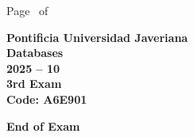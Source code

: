 \documentclass[11pt, addpoints]{exam}\usepackage[utf8]{inputenc}
\begin{document}
\begin{coverpages}
\begin{center}
			\vspace{3mm}
			\leavevmode \hspace{5mm} 
		\end{center}
	\end{coverpages}

	\footer{} {Page \thepage\ of \numpages} {}

	\centering
	\textbf{\Large Pontificia Universidad Javeriana}\\
	\textbf{\Large Databases} \\
	\textbf{\large 2025 -- 10} \\
	\textbf{\large 3rd Exam} \\
	\textbf{Code: A6E901}


	\begin{questions}
		
		
		
		
		
		
		
		
		
		
		
		
		
		
		
		
		
		
		
		
	\end{questions}

	\vspace{5mm}
	\noindent \textbf{End of Exam}
\end{document}
